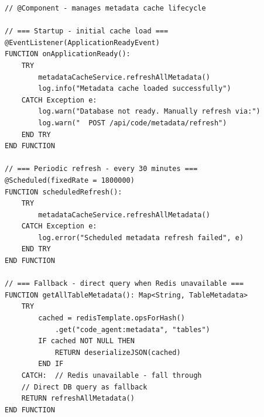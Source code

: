 \begin{table}[H]
\small\singlespacing
\centering
\caption{Pseudocode --- MetadataCacheManager Cache Lifecycle Management}
\label{tab:pseudocode-cache-lifecycle}
\vspace{2mm}

\begin{lstlisting}
// @Component - manages metadata cache lifecycle

// === Startup - initial cache load ===
@EventListener(ApplicationReadyEvent)
FUNCTION onApplicationReady():
    TRY
        metadataCacheService.refreshAllMetadata()
        log.info("Metadata cache loaded successfully")
    CATCH Exception e:
        log.warn("Database not ready. Manually refresh via:")
        log.warn("  POST /api/code/metadata/refresh")
    END TRY
END FUNCTION

// === Periodic refresh - every 30 minutes ===
@Scheduled(fixedRate = 1800000)
FUNCTION scheduledRefresh():
    TRY
        metadataCacheService.refreshAllMetadata()
    CATCH Exception e:
        log.error("Scheduled metadata refresh failed", e)
    END TRY
END FUNCTION

// === Fallback - direct query when Redis unavailable ===
FUNCTION getAllTableMetadata(): Map<String, TableMetadata>
    TRY
        cached = redisTemplate.opsForHash()
            .get("code_agent:metadata", "tables")
        IF cached NOT NULL THEN
            RETURN deserializeJSON(cached)
        END IF
    CATCH:  // Redis unavailable - fall through
    // Direct DB query as fallback
    RETURN refreshAllMetadata()
END FUNCTION
\end{lstlisting}
\end{table}


\vspace{3mm}

